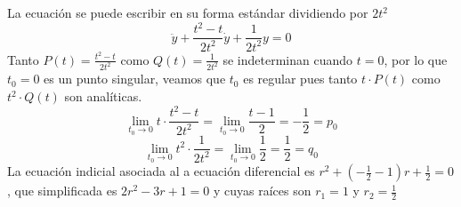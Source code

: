\documentclass{article}
\begin{document}
\begin{enumerate}
{            \color{azul}
            La ecuación se puede escribir en su forma estándar dividiendo por $2t^2$
            \[
                \ddot y + \frac{t^2-t}{2t^2}\dot y + \frac{1}{2t^2}y = 0
            \]
            Tanto $P(t)=\frac{t^2-t}{2t^2}$ como $Q(t)=\frac{1}{2t^2}$ se indeterminan cuando $t=0$, por lo que $t_0=0$
            es un punto singular, veamos que $t_0$ es regular pues tanto $t\cdot P(t)$ como $t^2\cdot Q(t)$ son
            analíticas.
            \[
                \lim_{t_0 \to 0}{t\cdot\frac{t^2-t}{2t^2}}
                =\lim_{t_0\to 0}{\frac{t-1}{2}}
                =-\frac{1}{2}=p_0
            \]
            \[
                \lim_{t_0\to 0}{t^2\cdot\frac{1}{2t^2}}
                =\lim_{t_0\to 0}{\frac{1}{2}}
                =\frac{1}{2}=q_0
            \]
            La ecuación indicial asociada al a ecuación diferencial es $r^2+(-\frac{1}{2}-1)r+\frac{1}{2}=0$, que
            simplificada es $2r^2-3r+1=0$ y cuyas raíces son $r_1=1$ y $r_2=\frac{1}{2}$

}
\end{enumerate}
\end{document}
